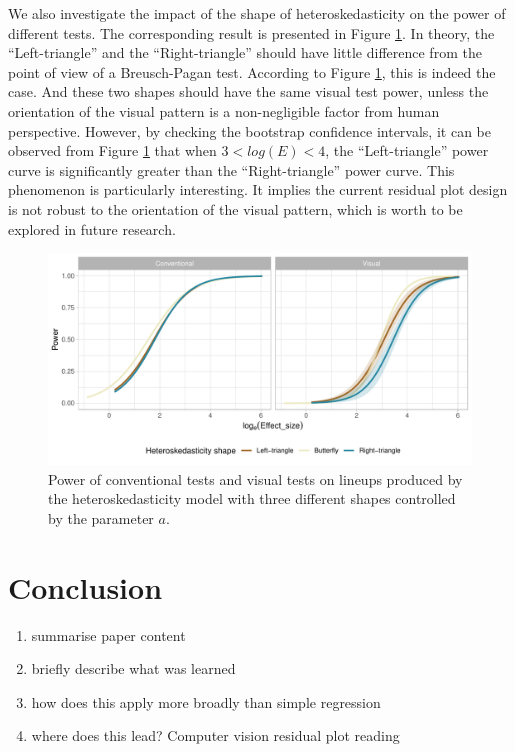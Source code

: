 \documentclass[]{interact}
\theoremstyle{plain}%
\theoremstyle{definition}
\theoremstyle{remark}
\providecommand{\tightlist}{%
  \setlength{\itemsep}{0pt}\setlength{\parskip}{0pt}}
\def\tightlist{}
\begin{document}
We also investigate the impact of the shape of heteroskedasticity on the
power of different tests. The corresponding result is presented in
Figure \ref{fig:heter-power-a}. In theory, the ``Left-triangle'' and the
``Right-triangle'' should have little difference from the point of view
of a Breusch-Pagan test. According to Figure \ref{fig:heter-power-a},
this is indeed the case. And these two shapes should have the same
visual test power, unless the orientation of the visual pattern is a
non-negligible factor from human perspective. However, by checking the
bootstrap confidence intervals, it can be observed from Figure
\ref{fig:heter-power-a} that when \(3 < log(E) < 4\), the
``Left-triangle'' power curve is significantly greater than the
``Right-triangle'' power curve. This phenomenon is particularly
interesting. It implies the current residual plot design is not robust
to the orientation of the visual pattern, which is worth to be explored
in future research.

\begin{figure}

{\centering \includegraphics[width=1\linewidth]{paper_comparison_files/figure-latex/heter-power-a-1} 

}

\caption{Power of conventional tests and visual tests on lineups produced by the heteroskedasticity model with three different shapes controlled by the parameter $a$.}\label{fig:heter-power-a}
\end{figure}

\hypertarget{conclusion}{%
\section{Conclusion}\label{conclusion}}

\begin{enumerate}
\def\labelenumi{\arabic{enumi}.}
\tightlist
\item
  summarise paper content
\item
  briefly describe what was learned
\item
  how does this apply more broadly than simple regression
\item
  where does this lead? Computer vision residual plot reading
\end{enumerate}
\end{document}
